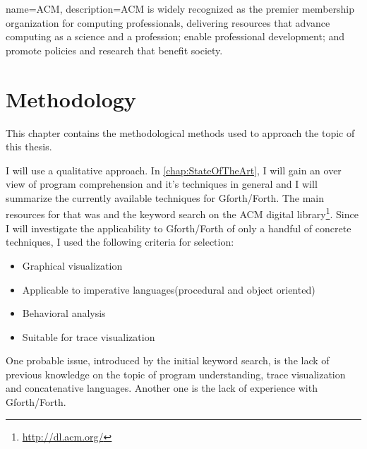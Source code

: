 {
  name={ACM},
  description={ACM is widely recognized as the premier membership organization for computing professionals, delivering resources that advance computing as a science and a profession; enable professional development; and promote policies and research that benefit society.}
}


\chapter{Methodology}
\label{chap:Methodology}

This chapter contains the methodological methods used to approach the topic of this thesis.

I will use a qualitative approach. In \autoref{chap:StateOfTheArt}, I will gain an over view of program comprehension and it's techniques in general and I will summarize the currently available techniques for Gforth/Forth. The main resources for that was \cite{Cornelissen:2009:SSP:1638616.1639301} and the keyword search on the \gls{ACM} digital library\footnote{\url{http://dl.acm.org/}}.
Since I will investigate the applicability to Gforth/Forth of only a handful of concrete techniques, I used the following criteria for selection:
\begin{itemize}
\item Graphical visualization 
\item Applicable to imperative languages(procedural and object oriented)
\item Behavioral analysis
\item Suitable for trace visualization
\end{itemize}
One probable issue, introduced by the initial keyword search, is the lack of previous knowledge on the topic of program understanding, trace visualization and concatenative languages. Another one is the lack of experience with Gforth/Forth.


